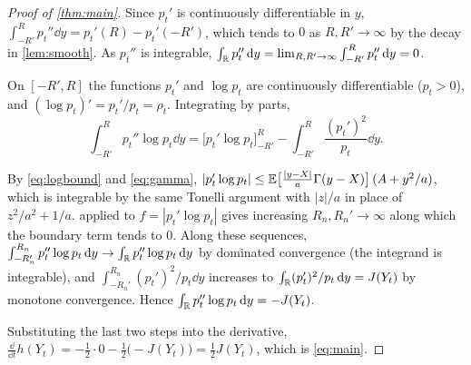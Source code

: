 \documentclass{saim-blog}
\begin{document}
\begin{proof}[Proof of \cref{thm:main}]
Since $p_t'$ is continuously differentiable in $y$, $\int_{-R'}^{R}p_t''\dd y=p_t'(R)-p_t'(-R')$, which tends to $0$ as $R,R'\to\infty$ by the decay in \cref{lem:smooth}. As $p_t''$ is integrable, $\int_{\mathbb{R}}p_t''\mathop{}\!\mathrm{d} y=\lim_{R,R'\to\infty}\int_{-R'}^{R}p_t''\mathop{}\!\mathrm{d} y=0$.

On $[-R',R]$ the functions $p_t'$ and $\log p_t$ are continuously differentiable ($p_t>0$), and $(\log p_t)'=p_t'/p_t=\rho_t$. Integrating by parts,
\[
\int_{-R'}^{R}p_t''\log p_t\dd y=\big[p_t'\log p_t\big]_{-R'}^{R}-\int_{-R'}^{R}\frac{(p_t')^2}{p_t}\dd y .
\]

By \eqref{eq:logbound} and \eqref{eq:gamma}, $|p_t'\log p_t|\le\mathbb{E}\big[\tfrac{|y-X|}{a}\Gamma(y-X)\big]\,(A+y^2/a)$, which is integrable by the same Tonelli argument with $|z|/a$ in place of $z^2/a^2+1/a$.  applied to $f=|p_t'\log p_t|$ gives increasing $R_n,R_n'\to\infty$ along which the boundary term tends to $0$. Along these sequences, $\int_{-R_n'}^{R_n}p_t''\log p_t\mathop{}\!\mathrm{d} y\to\int_{\mathbb{R}}p_t''\log p_t\mathop{}\!\mathrm{d} y$ by dominated convergence (the integrand is integrable), and $\int_{-R_n'}^{R_n}(p_t')^2/p_t\dd y$ increases to $\int_{\mathbb{R}}(p_t')^2/p_t\mathop{}\!\mathrm{d} y=J(Y_t)$ by monotone convergence. Hence $\int_{\mathbb{R}}p_t''\log p_t\mathop{}\!\mathrm{d} y=-J(Y_t)$.

Substituting the last two steps into the derivative, $\frac{\dd}{\dd t}h(Y_t)=-\tfrac12\cdot0-\tfrac12\big(-J(Y_t)\big)=\tfrac12J(Y_t)$, which is \eqref{eq:main}.
\end{proof}

\SecInsight
\end{document}
